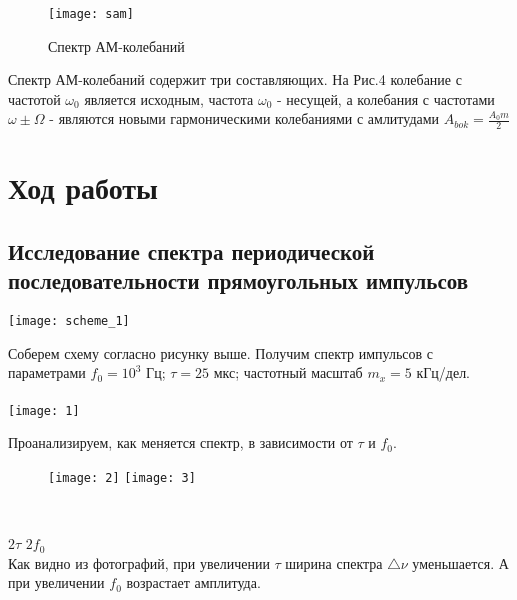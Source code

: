 \documentclass[a4paper,12pt]{article}
\begin{document}
\begin{figure}[ht]
\texttt{[image: sam]}
\caption{Спектр АМ-колебаний}
\end{figure}

\newpage
Спектр АМ-колебаний содержит три составляющих. На Рис.4 колебание с частотой $\omega_0$ является исходным, частота $\omega_0$ - несущей, а колебания с частотами $\omega\pm\Omega$ - являются новыми гармоническими колебаниями с амлитудами $A_{bok} = \frac{A_0m}{2}$

\section{Ход работы}
\subsection{Исследование спектра периодической последовательности прямоугольных импульсов}
\texttt{[image: scheme\_1]}

Соберем схему согласно рисунку выше. Получим спектр импульсов с параметрами $f_0=10^3$ Гц; $\tau=25$ мкс; частотный масштаб $m_x=5$ кГц/дел. \\
\ \\
\texttt{[image: 1]}
\newpage

Проанализируем, как меняется спектр, в зависимости от $\tau$ и $f_0$.
\begin{figure}[ht]
\texttt{[image: 2]}
\texttt{[image: 3]}
\end{figure}
\ \\
\par \hspace{3cm} $2\tau$
\hspace{8cm} $2f_0$
\ \\


Как видно из фотографий, при увеличении $\tau$ ширина спектра $\bigtriangleup\nu$ уменьшается. А при увеличении $f_0$ возрастает амплитуда.
\end{document}
